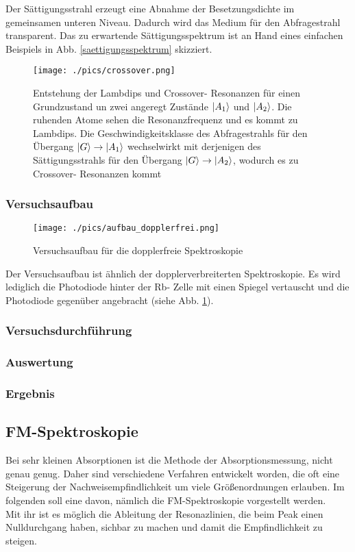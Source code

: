 \documentclass[a4paper,oneside]{article}
\begin{document}
Der Sättigungsstrahl erzeugt eine Abnahme der Besetzungsdichte im gemeinsamen unteren Niveau. Dadurch wird das Medium für den Abfragestrahl transparent. Das zu erwartende Sättigungsspektrum ist an Hand eines einfachen Beispiels in Abb. \ref{saettigungsspektrum} skizziert.
\begin{figure}
 \centering
 \texttt{[image: ./pics/crossover.png]}
 \caption[Crossoverresonanz]{Entstehung der Lambdips und Crossover- Resonanzen für einen Grundzustand un zwei angeregt Zustände $\ket{A_1}$ und $\ket{A_2}$. Die ruhenden Atome sehen die Resonanzfrequenz und es kommt zu Lambdips. Die Geschwindigkeitsklasse des Abfragestrahls für den Übergang $\ket{G}\rightarrow\ket{A_1}$ wechselwirkt mit derjenigen des Sättigungsstrahls für den Übergang $\ket{G}\rightarrow\ket{A_2}$, wodurch es zu Crossover- Resonanzen kommt}
\end{figure}



\subsubsection{Versuchsaufbau}
\begin{figure}
 \centering
 \texttt{[image: ./pics/aufbau\_dopplerfrei.png]}
 \caption[Dopperfreie Spektroskopie]{Versuchsaufbau für die dopplerfreie Spektroskopie}
 \label{aufbau_dopplerfrei}
\end{figure}
Der Versuchsaufbau ist ähnlich der dopplerverbreiterten Spektroskopie. Es wird lediglich die Photodiode hinter der Rb- Zelle mit einen Spiegel vertauscht und die Photodiode gegenüber angebracht (siehe Abb. \ref{aufbau_dopplerfrei}).

\subsubsection{Versuchsdurchführung}
\subsubsection{Auswertung}
\subsubsection{Ergebnis}


\subsection{FM-Spektroskopie}
Bei sehr kleinen Absorptionen ist die Methode der Absorptionsmessung, nicht genau genug. Daher sind verschiedene Verfahren entwickelt worden, die oft eine Steigerung der Nachweisempfindlichkeit um viele Größenordnungen erlauben. Im folgenden soll eine davon, nämlich die FM-Spektroskopie vorgestellt werden.\\
Mit ihr ist es möglich die Ableitung der Resonazlinien, die beim Peak einen Nulldurchgang haben, sichbar zu machen und damit die Empfindlichkeit zu steigen.
\end{document}
